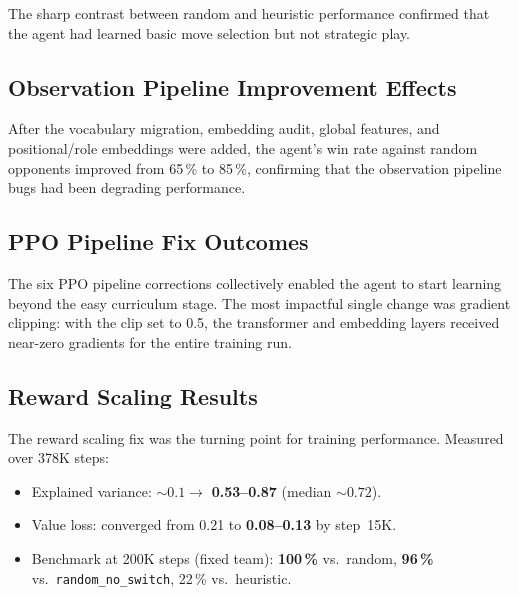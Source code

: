 The sharp contrast between random and heuristic performance confirmed that the
agent had learned basic move selection but not strategic play.

\subsection{Observation Pipeline Improvement Effects}

After the vocabulary migration, embedding audit, global features, and
positional/role embeddings were added, the agent's win rate against random
opponents improved from 65\,\% to 85\,\%, confirming that the observation
pipeline bugs had been degrading performance.

\subsection{PPO Pipeline Fix Outcomes}

The six PPO pipeline corrections collectively enabled the agent to start
learning beyond the easy curriculum stage.  The most impactful single change
was gradient clipping: with the clip set to 0.5, the transformer and embedding
layers received near-zero gradients for the entire training run.

\subsection{Reward Scaling Results}
\label{sec:reward_scaling_results}

The reward scaling fix was the turning point for training performance.
Measured over 378K steps:

\begin{itemize}
  \item Explained variance: ${\sim}0.1 \to$ \textbf{0.53--0.87} (median
        ${\sim}0.72$).
  \item Value loss: converged from 0.21 to \textbf{0.08--0.13} by
        step~15K.
  \item Benchmark at 200K steps (fixed team): \textbf{100\,\%} vs.\ random,
        \textbf{96\,\%} vs.\ \texttt{random\_no\_switch}, 22\,\% vs.\
        heuristic.
\end{itemize}


